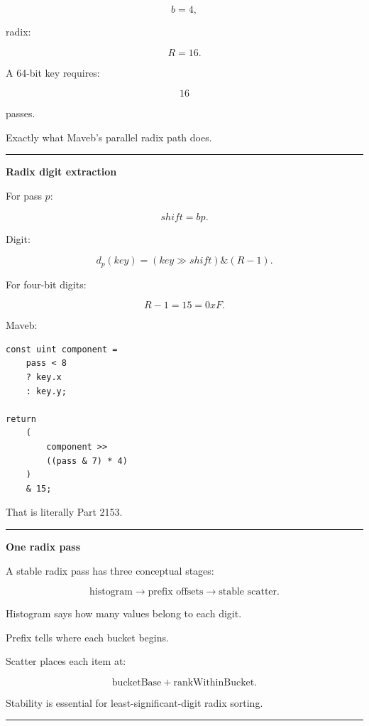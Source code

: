 \[
b=4,
\]

radix:

\[
R=16.
\]

A 64-bit key requires:

\[
16
\]

passes.

Exactly what Maveb's parallel radix path does.

\begin{center}\rule{0.5\linewidth}{0.5pt}\end{center}

\textbf{Radix digit extraction}

For pass \(p\):

\[
shift=bp.
\]

Digit:

\[
\boxed{
d_p(key)
=
(key\gg shift)
\&
(R-1).
}
\]

For four-bit digits:

\[
R-1=15=0xF.
\]

Maveb:

\protect{}\label{ugtp35}%
\begin{verbatim}
const uint component =
    pass < 8
    ? key.x
    : key.y;

return
    (
        component >>
        ((pass & 7) * 4)
    )
    & 15;
\end{verbatim}

That is literally Part 2153.

\begin{center}\rule{0.5\linewidth}{0.5pt}\end{center}

\textbf{One radix pass}

A stable radix pass has three conceptual stages:

\[
\boxed{
\text{histogram}
\rightarrow
\text{prefix offsets}
\rightarrow
\text{stable scatter}.
}
\]

Histogram says how many values belong to each digit.

Prefix tells where each bucket begins.

Scatter places each item at:

\[
\text{bucketBase}
+
\text{rankWithinBucket}.
\]

Stability is essential for least-significant-digit radix sorting.

\begin{center}\rule{0.5\linewidth}{0.5pt}\end{center}

